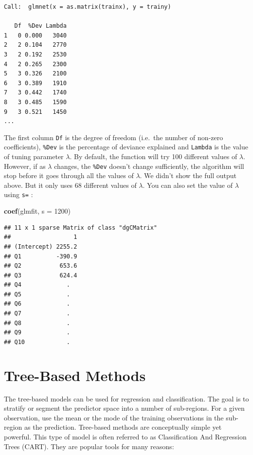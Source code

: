 \documentclass[12pt,]{krantz}
\makeatletter
\newenvironment{Shaded}{\begin{snugshade}}{\end{snugshade}}
\newcommand{\DataTypeTok}[1]{\textcolor[rgb]{0.27,0.27,0.27}{#1}}
\newcommand{\DecValTok}[1]{\textcolor[rgb]{0.06,0.06,0.06}{#1}}
\newcommand{\KeywordTok}[1]{\textcolor[rgb]{0.27,0.27,0.27}{\textbf{#1}}}
\newcommand{\NormalTok}[1]{#1}
\newenvironment{kframe}{%
\medskip{}
\setlength{\fboxsep}{.8em}
 \def\at@end@of@kframe{}%
 \ifinner\ifhmode%
  \def\at@end@of@kframe{\end{minipage}}%
  \begin{minipage}{\columnwidth}%
 \fi\fi%
 \def\FrameCommand##1{\hskip\@totalleftmargin \hskip-\fboxsep
 \colorbox{shadecolor}{##1}\hskip-\fboxsep
     \hskip-\linewidth \hskip-\@totalleftmargin \hskip\columnwidth}%
 \MakeFramed {\advance\hsize-\width
   \@totalleftmargin\z@ \linewidth\hsize
   \@setminipage}}%
 {\par\unskip\endMakeFramed%
 \at@end@of@kframe}
\renewenvironment{Shaded}{\begin{kframe}}{\end{kframe}}
\makeatother
\begin{document}
\begin{verbatim}
Call:  glmnet(x = as.matrix(trainx), y = trainy) 

   Df  %Dev Lambda
1   0 0.000   3040
2   2 0.104   2770
3   2 0.192   2530
4   2 0.265   2300
5   3 0.326   2100
6   3 0.389   1910
7   3 0.442   1740
8   3 0.485   1590
9   3 0.521   1450
...
\end{verbatim}

The first column \texttt{Df} is the degree of freedom (i.e.~the number of non-zero coefficients), \texttt{\%Dev} is the percentage of deviance explained and \texttt{Lambda} is the value of tuning parameter \(\lambda\). By default, the function will try 100 different values of \(\lambda\). However, if as \(\lambda\) changes, the \texttt{\%Dev} doesn't change sufficiently, the algorithm will stop before it goes through all the values of \(\lambda\). We didn't show the full output above. But it only uses 68 different values of \(\lambda\). You can also set the value of \(\lambda\) using \texttt{s=} :

\begin{Shaded}
\begin{Highlighting}[]
\KeywordTok{coef}\NormalTok{(glmfit, }\DataTypeTok{s =} \DecValTok{1200}\NormalTok{)}
\end{Highlighting}
\end{Shaded}

\begin{verbatim}
## 11 x 1 sparse Matrix of class "dgCMatrix"
##                  1
## (Intercept) 2255.2
## Q1          -390.9
## Q2           653.6
## Q3           624.4
## Q4             .  
## Q5             .  
## Q6             .  
## Q7             .  
## Q8             .  
## Q9             .  
## Q10            .
\end{verbatim}

\hypertarget{tree-based-methods}{%
\chapter{Tree-Based Methods}\label{tree-based-methods}}

The tree-based models can be used for regression and classification. The goal is to stratify or segment the predictor space into a number of sub-regions. For a given observation, use the mean or the mode of the training observations in the sub-region as the prediction. Tree-based methods are conceptually simple yet powerful. This type of model is often referred to as Classification And Regression Trees (CART). They are popular tools for many reasons:
\end{document}

